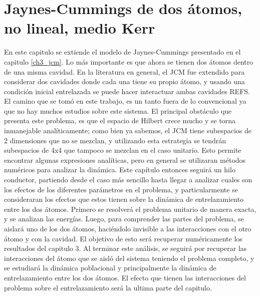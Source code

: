 \chapter{Jaynes-Cummings de dos átomos, no lineal, medio Kerr}
\label{ch4_dinamica}

\pagestyle{fancy}
\fancyhf{}
\fancyhead[LE]{\nouppercase{\rightmark\hfill}}
\fancyhead[RO]{\nouppercase{\leftmark\hfill}}
\fancyfoot[LE,RO]{\hfill\thepage\hfill}

En este capitulo se extiende el modelo de Jaynes-Cummings presentado en el capitulo \ref{ch3_jcm}. Lo más importante es que ahora se tienen dos átomos dentro de una misma cavidad. En la literatura en general, el JCM fue extendido para considerar dos cavidades donde cada una tiene su propio átomo, y usando una condición inicial entrelazada se puede hacer interactuar ambas cavidades REFS. El camino que se tomó en este trabajo, es un tanto fuera de lo convencional ya que no hay muchos estudios sobre este sistema. El principal obstáculo que presenta este problema, es que el espacio de Hilbert crece mucho y se torna inmanejable analíticamente; como bien ya sabemos, el JCM tiene subespacios de 2 dimensiones que no se mezclan, y utilizando esta estrategia  se tendrán subespacios de 4x4 que tampoco se mezclan en el caso unitario. Esto permite encontrar algunas expresiones analíticas, pero en general se utilizaran métodos numéricos para analizar la dinámica. \newline
Este capítulo entonces seguirá un hilo conductor, partiendo desde el caso más sencillo hasta llegar a analizar cuales son los efectos de los diferentes parámetros en el problema, y particularmente se consideraran los efectos que estos tienen sobre la dinámica de entrelazamiento entre los dos átomos. 
Primero se resolverá el problema unitario de manera exacta, y se analizan las energías. Luego, para comprender las partes del problema, se aislará uno de los dos átomos, haciéndolo invisible a las interacciones con el otro átomo y con la cavidad. El objetivo de esto será recuperar numéricamente los resultados del capitulo 3. Al terminar este análisis, se seguirá por recuperar las interacciones del átomo que se aisló del sistema teniendo el problema completo, y se estudiará la dinámica poblacional y principalmente la dinámica de entrelazamiento entre los dos átomos. El efecto que tienen las interacciones del problema sobre el entrelazamiento será la ultima parte del capitulo.



